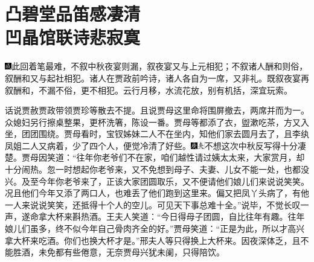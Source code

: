 \chapter{凸碧堂品笛感凄清\\凹晶馆联诗悲寂寞}

{\includegraphics[width=3mm]{../Images/00005}\kaishu 此回着笔最难，不叙中秋夜宴则漏，叙夜宴又与上元相犯；不叙诸人酬和则俗，叙酬和又与起社相犯。诸人在贾政前吟诗，诸人各自为一席，又非礼。既叙夜宴再叙酬和，不漏不俗，更不相犯。云行月移，水流花放，别有机括，深宜玩索。}

话说贾赦贾政带领贾珍等散去不提。且说贾母这里命将围屏撤去，两席并而为一。众媳妇另行擦桌整果，更杯洗箸，陈设一番。贾母等都添了衣，盥漱吃茶，方又入坐，团团围绕。贾母看时，宝钗姊妹二人不在坐内，知他们家去圆月去了，且李纨凤姐二人又病着，少了四个人，便觉冷清了好些。{\includegraphics[width=3mm]{../Images/00004}\includegraphics[width=3mm]{../Images/00012}\footnotesize \kaishu 不想这次中秋反写得十分凄楚。}贾母因笑道：``往年你老爷们不在家，咱们越性请过姨太太来，大家赏月，却十分闹热。忽一时想起你老爷来，又不免想到母子、夫妻、儿女不能一处，也都没兴。及至今年你老爷来了，正该大家团圆取乐，又不便请他们娘儿们来说说笑笑。况且他们今年又添了两口人，也难丢了他们跑到这里来。偏又把凤丫头病了，有他一人来说说笑笑，还抵得十个人的空儿。可见天下事总难十全。''说毕，不觉长叹一声，遂命拿大杯来斟热酒。王夫人笑道：``今日得母子团圆，自比往年有趣。往年娘儿们虽多，终不似今年自己骨肉齐全的好。''贾母笑道：``正是为此，所以才高兴拿大杯来吃酒。你们也换大杯才是。''邢夫人等只得换上大杯来。因夜深体乏，且不能胜酒，未免都有些倦意，无奈贾母兴犹未阑，只得陪饮。

